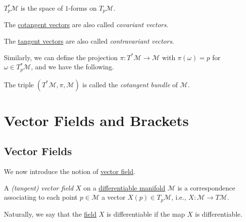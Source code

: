 \begin{remark}
	\(T^{\ast} _p \mathcal{M} \) is the space of \(1\)-forms on \(T_p \mathcal{M} \).
\end{remark}

\begin{notation}\label{not:covariant-vector}
	The \hyperref[def:cotangent-vector]{cotangent vectors} are also called \emph{covariant vectors}.
\end{notation}

\begin{notation}\label{not:contravariant-vector}
	The \hyperref[def:tangent-vector]{tangent vectors} are also called \emph{contravariant vectors}.
\end{notation}

Similarly, we can define the projection \(\pi \colon T ^{\ast} \mathcal{M} \to \mathcal{M} \) with \(\pi (\omega ) = p\) for \(\omega \in T^{\ast} _p \mathcal{M} \), and we have the following.

\begin{definition}\label{def:cotangent-bundle}
	The triple \((T^{\ast} \mathcal{M} , \pi , \mathcal{M} )\) is called the \emph{cotangent bundle} of \(\mathcal{M} \).
\end{definition}

\section{Vector Fields and Brackets}
\subsection{Vector Fields}
We now introduce the notion of \hyperref[def:vector-field]{vector field}.

\begin{definition}\label{def:vector-field}
	A \emph{(tangent) vector field} \(X\) on a \hyperref[def:smooth-manifold]{differentiable manifold} \(\mathcal{M} \) is a correspondence associating to each point \(p\in \mathcal{M} \) a vector \(X(p)\in T_p \mathcal{M} \), i.e., \(X\colon \mathcal{M} \to T\mathcal{M} \).
\end{definition}

\begin{remark}
	Naturally, we say that the \hyperref[def:vector-field]{field} \(X\) is differentiable if the map \(X\) is differentiable.
\end{remark}

